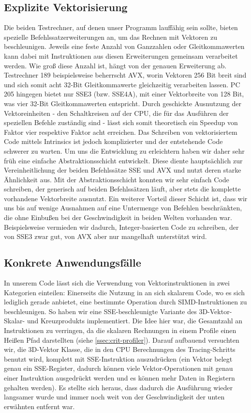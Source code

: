 \subsection{Explizite Vektorisierung}
Die beiden Testrechner, auf denen unser Programm lauffähig sein sollte, bieten spezielle Befehlssatzerweiterungen an, um das Rechnen mit Vektoren zu beschleunigen.
Jeweils eine feste Anzahl von Ganzzahlen oder Gleitkommawerten kann dabei mit Instruktionen aus diesen Erweiterungen gemeinsam verarbeitet werden.
Wie groß diese Anzahl ist, hängt von der genauen Erweiterung ab.
Testrechner 189 beispielsweise beherrscht AVX, worin Vektoren 256 Bit breit sind und sich somit acht 32-Bit Gleitkommawerte gleichzeitig verarbeiten lassen.
PC 205 hingegen bietet nur SSE3 (bzw. SSE4A), mit einer Vektorbreite von 128 Bit, was vier 32-Bit Gleitkommawerten entspricht.
Durch geschickte Ausnutzung der Vektoreinheiten - den Schaltkreisen auf der CPU, die für das Ausführen der speziellen Befehle zuständig sind - lässt sich somit theoretisch ein Speedup von Faktor vier respektive Faktor acht erreichen.
Das Schreiben von vektorisiertem Code mittels Intrinsics ist jedoch komplizierter und der entstehende Code schwerer zu warten.
Um uns die Entwicklung zu erleichtern haben wir daher sehr früh eine einfache Abstraktionsschicht entwickelt.
Diese diente hauptsächlich zur Vereinheitlichung der beiden Befehlssätze SSE und AVX und nutzt deren starke Ähnlichkeit aus.
Mit der Abstraktionsschicht konnten wir sehr einfach Code schreiben, der generisch auf beiden Befehlssätzen läuft, aber stets die komplette vorhandene Vektorbreite ausnutzt.
Ein weiterer Vorteil dieser Schicht ist, dass wir uns bis auf wenige Ausnahmen auf eine Untermenge von Befehlen beschränkten, die ohne Einbußen bei der Geschwindigkeit in beiden Welten vorhanden war.
Beispielsweise vermieden wir dadurch, Integer-basierten Code zu schreiben, der von SSE3 zwar gut, von AVX aber nur mangelhaft unterstützt wird.

\subsection{Konkrete Anwendungsfälle}
In unserem Code lässt sich die Verwendung von Vektorinstruktionen in zwei Kategorien einteilen:
Einerseits die Nutzung in an sich skalarem Code, wo es sich lediglich gerade anbietet, eine bestimmte Operation durch SIMD-Instruktionen zu beschleunigen.
So haben wir eine SSE-beschleunigte Variante des 3D-Vektor-Skalar- und Kreuzprodukts implementiert.
Die Idee hier war, die Gesamtzahl an Instruktionen zu verringen, da die skalaren Rechnungen in einem Profile einen Heißen Pfad darstellten (siehe \ref{ssec:crit-profiler}).
Darauf aufbauend versuchten wir, die 3D-Vektor Klasse, die in den CPU Berechnungen des Tracing-Schritts benutzt wird, komplett mit SSE-Instruktion auszudrücken (ein Vektor belegt genau ein SSE-Register, dadurch können viele Vektor-Operationen mit genau einer Instruktion ausgedrückt werden und es können mehr Daten in Registern gehalten werden).
Es stellte sich heraus, dass dadurch die Ausführung wieder langsamer wurde und immer noch weit von der Geschwindigkeit der unten erwähnten  entfernt war.

